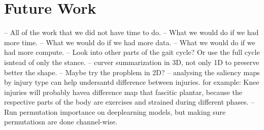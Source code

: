 \section{Future Work}\label{sec:conc-future-work}
-- All of the work that we did not have time to do.
-- What we would do if we had more time.
-- What we would do if we had more data.
-- What we would do if we had more compute.
-- Look into other parts of the gait cycle? Or use the full cycle isntead of only the stance.
-- curver summarization in 3D, not only 1D to preserve better the shape.
-- Maybe try the propblem in 2D?
-- analysing the saliency maps by injury type can help undersantd difference between injuries. for example: Knee injuries will probably havea difference map that fascitic plantar, because the respective parts of the body are exercises and strained during different phases.
-- Run permutation importance on deeplearning models, but making sure permutatiosn are done channel-wise.
